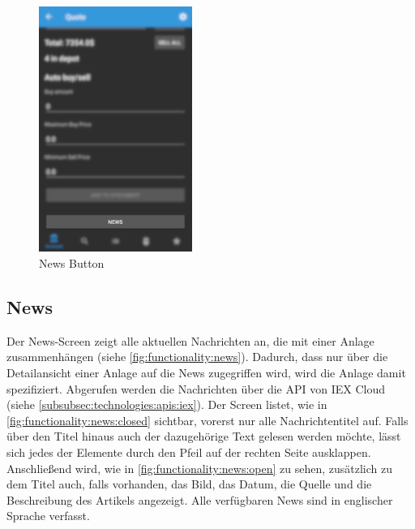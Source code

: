 \documentclass[a4paper]{article}
\begin{document}
\begin{figure}[H]
    \centering
    \includegraphics[height=8cm,keepaspectratio]{./images/news/news_button.png}
    \caption{News Button}
    \label{fig:functionality:news:button}
\end{figure}


\subsection{News}
\label{subsec:functionality:news}
Der News-Screen zeigt alle aktuellen Nachrichten an, die mit einer Anlage zusammenhängen (siehe \autoref{fig:functionality:news}). Dadurch, dass nur über die Detailansicht einer Anlage auf die News zugegriffen wird, wird die Anlage damit spezifiziert. Abgerufen werden die Nachrichten über die API von IEX Cloud (siehe \autoref{subsubsec:technologies:apis:iex}). Der Screen listet, wie in \autoref{fig:functionality:news:closed} sichtbar, vorerst nur alle Nachrichtentitel auf. Falls über den Titel hinaus auch der dazugehörige Text gelesen werden möchte, lässt sich jedes der Elemente durch den Pfeil auf der rechten Seite ausklappen. Anschließend wird, wie in \autoref{fig:functionality:news:open} zu sehen, zusätzlich zu dem Titel auch, falls vorhanden, das Bild, das Datum, die Quelle und die Beschreibung des Artikels angezeigt. Alle verfügbaren News sind in englischer Sprache verfasst.
\end{document}

